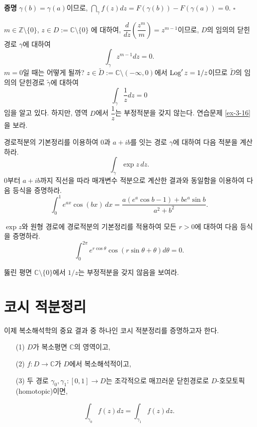 {\bf 증명}
$\gamma(b)=\gamma(a)$이므로,
$\dint_\gamma f(z)dz = F(\gamma(b)) - F(\gamma(a)) = 0$.
\hfill $\square$

\begin{saltexample}[label=example-3-7]{}{}
$m\in\mathbb Z\setminus \{0\}$, $z\in D:=\mathbb C \setminus\{0\}$
에 대하여, 
$\dfrac d{dz}\left( \dfrac{z^m}m\right) = z^{m-1}$이므로,
$D$의 임의의 닫힌경로 $\gamma$에 대하여
\[
\int_\gamma z^{m-1}dz = 0.
\]
$m=0$일 때는 어떻게 될까?
$z\in\tilde D:= \mathbb C \setminus (-\infty,0)$에서
$\mathop{\mathrm{Log}}' z = 1/z$이므로 $\tilde D$의 임의의 닫힌경로 $\tilde \gamma$에 대하여
\[
\int_{\tilde\gamma} \frac1z dz = 0
\]
임을 알고 있다. 하지만, 영역 $D$에서 $\dfrac 1z$는 부정적분을 갖지 않는다.
연습문제 \ref{ex-3-16}을 보라.
\end{saltexample}

\begin{salt_exercise} \label{ex-3-14}
경로적분의 기본정리를 이용하여 
$0$과 $a+ib$를 잇는 경로 $\gamma$에 대하여
다음 적분을 계산하라.
\[
\int_\gamma \exp z \, dz.
\]
$0$부터 $a+ib$까지 직선을 따라 매개변수 적분으로 계산한 결과와 동일함을 이용하여
다음 등식을 증명하라.
\[
\int_0^1 e^{ax}\cos(bx)\, dx = \dfrac{a(e^a\cos b - 1) + be^a\sin b}{a^2+b^2}.
\]
\end{salt_exercise}

\begin{salt_exercise} \label{ex-3-15}
$\exp z$와 원형 경로에 경로적분의 기본정리를 적용하여
모든 $r>0$에 대하여 다음 등식을 증명하라.
\[
\int_0^{2\pi} e^{r\cos\theta} \cos(r\sin\theta+\theta)d\theta = 0.
\]
\end{salt_exercise}

\begin{salt_exercise} \label{ex-3-16}
뚫린 평면 $\mathbb C\setminus \{0\}$에서 $1/z$는 부정적분을 갖지 않음을 보여라.
\end{salt_exercise}

\section{코시 적분정리}

이제 복소해석학의 중요 결과 중 하나인 코시 적분정리를 증명하고자 한다.

\begin{salttheorem} [코시 적분정리] {}{} \label{thm-3-4}

\begin{itemize}
\item[(1)] $D$가 복소평면 $\mathbb C$의 영역이고,
\item[(2)] $f:D\to\mathbb C$가 $D$에서 복소해석적이고,
\item[(3)] 두 경로 $\gamma_0, \gamma_1 :[0,1]\to D$는  조각적으로 매끄러운 닫힌경로로
$D$-호모토픽(homotopic)이면,
\end{itemize}
\[
\int_{\gamma_0} f(z)dz = \int_{\gamma_1} f(z)dz.
\]
\end{salttheorem}

